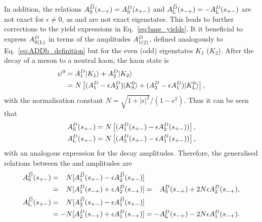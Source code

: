 In addition, the relations $A_{\rm S}^{{\kern 0.18em\overline{\kern -0.18em D}}}(s_{-+})=A_{\rm S}^{D}(s_{+-})$ and $A_{\rm L}^{{\kern 0.18em\overline{\kern -0.18em D}}}(s_{-+})=-A_{\rm L}^{D}(s_{+-})$ are not exact for $\epsilon \neq 0$, as \KS and \KL  are not exact \CP eigenstates. This leads to further corrections to the yield expressions in Eq.~\eqref{eq:base_yields}. It it beneficial to express $A^{D}_\text{S(L)}$ in terms of the amplitudes $A^{D}_{1(2)}$, defined analogously to  Eq.~\eqref{eq:ADDb_definition} but for the \CP even (odd) eigenstates $K_1$ ($K_2$). After the decay of a \Dz meson to a neutral kaon, the kaon state is
\begin{align}
\begin{split}
    \psi^0 &= A^{D}_1 |K_1\rangle + A^{D}_2|K_2\rangle \\
    &= N\left[(A^{D}_1-\epsilon A^{D}_2)|{{K}^0_{\mathrm{S}}}\rangle
    + (A^{D}_2-\epsilon A^{D}_1)|{{K}^0_{\mathrm{L}}}\rangle\right],
\end{split}
\end{align}
with the normalisation constant $N=\sqrt{1+|\epsilon|^2}/(1-\epsilon^2)$. Thus it can be seen that
\begin{align}
\begin{split}\label{eq:A12toKS}
    A^{D}_\text{S}(s_{+-}) &= N\left[(A^{D}_1(s_{+-})-\epsilon A^{D}_2(s_{+-}))\right], \\
    A^{D}_\text{L}(s_{+-}) &= N\left[(A^{D}_2(s_{+-})-\epsilon A^{D}_1(s_{+-}))\right],
\end{split}
\end{align}
with an analogous expression for the \Dzb decay amplitudes. Therefore, the  generalised relations between the \Dz and \Dzb amplitudes are
\begin{align}
\begin{split}\label{eq:DDbar_relations}
    A_{\rm S}^{{\kern 0.18em\overline{\kern -0.18em D}}}(s_{+-}) &= \phantom{-}N[A^{\kern 0.18em\overline{\kern -0.18em D}}_1(s_{+-})-\epsilon A^{\kern 0.18em\overline{\kern -0.18em D}}_2(s_{+-})]
    \\
    &= \phantom{-}N[A^{D}_1(s_{-+})+\epsilon A^{D}_2(s_{-+})]  = \phantom{-}A_{\rm S}^{D}(s_{-+}) + 2N\epsilon A^{D}_2(s_{-+}),
    \\
    A_{\rm L}^{{\kern 0.18em\overline{\kern -0.18em D}}}(s_{+-}) &= \phantom{-}N [A^{\kern 0.18em\overline{\kern -0.18em D}}_2(s_{+-})-\epsilon A^{\kern 0.18em\overline{\kern -0.18em D}}_1(s_{+-}) ]
    \\
    & = -N[A^{D}_2(s_{-+})+\epsilon A^{D}_1(s_{-+})] = -A_{\rm L}^{D}(s_{-+}) - 2N\epsilon A^{D}_1(s_{-+}).
\end{split}
\end{align} 

